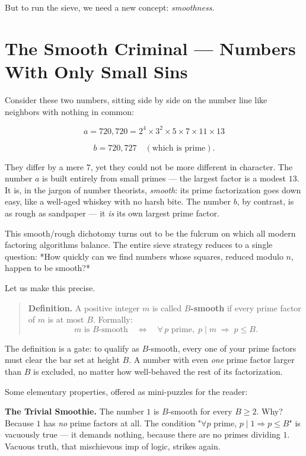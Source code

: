 But to run the sieve, we need a new concept: \textit{smoothness}.


\ornbreak



\section{The Smooth Criminal --- Numbers With Only Small Sins}


Consider these two numbers, sitting side by side on the number line like neighbors with nothing in common:

\[
a = 720{,}720 = 2^4 \times 3^2 \times 5 \times 7 \times 11 \times 13
\]

\[
b = 720{,}727 \quad (\text{which is prime}).
\]

They differ by a mere $7$, yet they could not be more different in character. The number $a$ is built entirely from small primes --- the largest factor is a modest $13$. It is, in the jargon of number theorists, \textit{smooth}: its prime factorization goes down easy, like a well-aged whiskey with no harsh bite. The number $b$, by contrast, is as rough as sandpaper --- it \textit{is} its own largest prime factor.

This smooth/rough dichotomy turns out to be the fulcrum on which all modern factoring algorithms balance. The entire sieve strategy reduces to a single question: *How quickly can we find numbers whose squares, reduced modulo $n$, happen to be smooth?*

Let us make this precise.

\begin{quote}
\textbf{Definition.} A positive integer $m$ is called \textbf{$B$-smooth} if every prime factor of $m$ is at most $B$. Formally:
$$m \text{ is } B\text{-smooth} \quad\Longleftrightarrow\quad \forall\, p \text{ prime},\; p \mid m \;\Rightarrow\; p \leq B.$$
\end{quote}

The definition is a gate: to qualify as $B$-smooth, every one of your prime factors must clear the bar set at height $B$. A number with even \textit{one} prime factor larger than $B$ is excluded, no matter how well-behaved the rest of its factorization.

Some elementary properties, offered as mini-puzzles for the reader:

\textbf{The Trivial Smoothie.} The number $1$ is $B$-smooth for every $B \geq 2$. Why? Because $1$ has \textit{no} prime factors at all. The condition "$\forall p$ prime, $p \mid 1 \Rightarrow p \leq B$" is vacuously true --- it demands nothing, because there are no primes dividing $1$. Vacuous truth, that mischievous imp of logic, strikes again.

